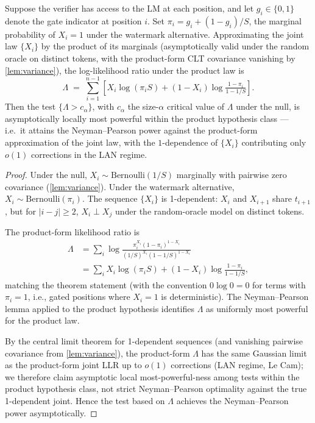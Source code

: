 \begin{theorem}
  \label{thm:hdd}
  Suppose the verifier has access to the LM at each position, and
  let $g_i \in \{0,1\}$ denote the gate indicator at position $i$.
  Set $\pi_i = g_i + (1 - g_i)/S$, the marginal probability of
  $X_i = 1$ under the watermark alternative. Approximating the
  joint law $\{X_i\}$ by the product of its marginals (asymptotically
  valid under the random oracle on distinct tokens, with the
  product-form CLT covariance vanishing by \autoref{lem:variance}),
  the log-likelihood ratio under the product law is
  \begin{equation}
    \Lambda
      \;=\; \sum_{i=1}^{n-1}\!
        \left[ X_i \log(\pi_i S)
          + (1 - X_i) \log \tfrac{1 - \pi_i}{1 - 1/S}\right].
  \end{equation}
  Then the test $\{\Lambda > c_\alpha\}$, with $c_\alpha$ the
  size-$\alpha$ critical value of $\Lambda$ under the null, is
  asymptotically locally most powerful within the product hypothesis
  class — i.e.\ it attains the Neyman--Pearson power against the
  product-form approximation of the joint law, with the
  $1$-dependence of $\{X_i\}$ contributing only $o(1)$ corrections
  in the LAN regime.
\end{theorem}

\begin{proof}
  Under the null, $X_i \sim \mathrm{Bernoulli}(1/S)$ marginally with
  pairwise zero covariance (\autoref{lem:variance}).  Under the
  watermark alternative, $X_i \sim \mathrm{Bernoulli}(\pi_i)$.  The
  sequence $\{X_i\}$ is 1-dependent: $X_i$ and $X_{i+1}$ share
  $t_{i+1}$, but for $|i-j| \geq 2$, $X_i \perp X_j$ under the
  random-oracle model on distinct tokens.

  The product-form likelihood ratio is
  \begin{align*}
    \Lambda
      &= \sum_i \log \frac{\pi_i^{X_i}(1 - \pi_i)^{1 - X_i}}
        {(1/S)^{X_i}(1 - 1/S)^{1 - X_i}} \\
      &= \sum_i X_i \log(\pi_i S)
        + (1 - X_i) \log \tfrac{1 - \pi_i}{1 - 1/S},
  \end{align*}
  matching the theorem statement (with the convention $0 \log 0 = 0$
  for terms with $\pi_i = 1$, i.e., gated positions where $X_i = 1$
  is deterministic).  The Neyman--Pearson lemma applied to the
  product hypothesis identifies $\Lambda$ as uniformly most powerful
  for the product law.

  By the central limit theorem for 1-dependent sequences (and
  vanishing pairwise covariance from \autoref{lem:variance}), the
  product-form $\Lambda$ has the same Gaussian limit as the
  product-form joint LLR up to $o(1)$ corrections (LAN regime,
  Le Cam); we therefore claim asymptotic local most-powerful-ness
  among tests within the product hypothesis class, not strict
  Neyman--Pearson optimality against the true 1-dependent joint.
  Hence the test based on
  $\Lambda$ achieves the Neyman--Pearson power asymptotically.
\end{proof}

